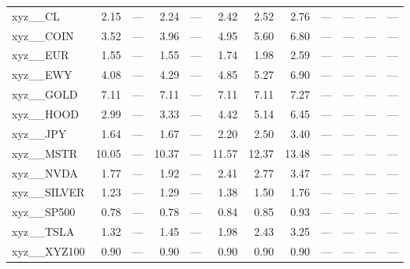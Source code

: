 \begin{table}[h]
\begin{tabular}{lrrrrrrrrrrr}
xyz__CL & 2.15 & — & 2.24 & — & 2.42 & 2.52 & 2.76 & — & — & — & — \\
xyz__COIN & 3.52 & — & 3.96 & — & 4.95 & 5.60 & 6.80 & — & — & — & — \\
xyz__EUR & 1.55 & — & 1.55 & — & 1.74 & 1.98 & 2.59 & — & — & — & — \\
xyz__EWY & 4.08 & — & 4.29 & — & 4.85 & 5.27 & 6.90 & — & — & — & — \\
xyz__GOLD & 7.11 & — & 7.11 & — & 7.11 & 7.11 & 7.27 & — & — & — & — \\
xyz__HOOD & 2.99 & — & 3.33 & — & 4.42 & 5.14 & 6.45 & — & — & — & — \\
xyz__JPY & 1.64 & — & 1.67 & — & 2.20 & 2.50 & 3.40 & — & — & — & — \\
xyz__MSTR & 10.05 & — & 10.37 & — & 11.57 & 12.37 & 13.48 & — & — & — & — \\
xyz__NVDA & 1.77 & — & 1.92 & — & 2.41 & 2.77 & 3.47 & — & — & — & — \\
xyz__SILVER & 1.23 & — & 1.29 & — & 1.38 & 1.50 & 1.76 & — & — & — & — \\
xyz__SP500 & 0.78 & — & 0.78 & — & 0.84 & 0.85 & 0.93 & — & — & — & — \\
xyz__TSLA & 1.32 & — & 1.45 & — & 1.98 & 2.43 & 3.25 & — & — & — & — \\
xyz__XYZ100 & 0.90 & — & 0.90 & — & 0.90 & 0.90 & 0.90 & — & — & — & — \\
\bottomrule
\end{tabular}
\end{table}